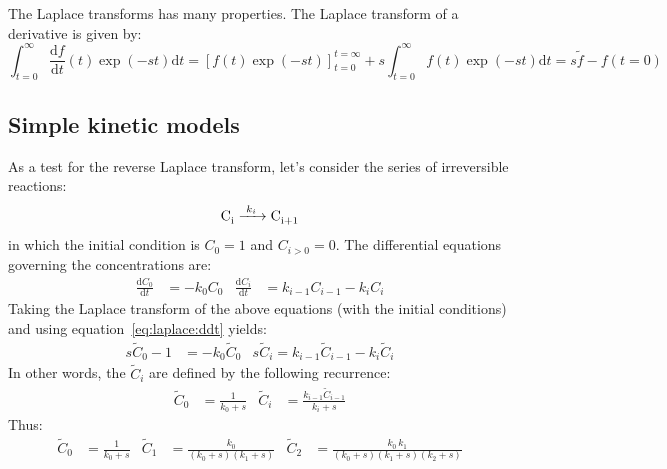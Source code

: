 \documentclass{article}
\newcommand{\dd}{\mathrm{d}}
\newcommand{\ddt}[1]{\frac{\dd #1}{\dd t}}
\newcommand{\pa}[1]{\left(#1\right)}
\begin{document}
\begin{testresult}
  \begin{center}
  \end{center}
  \caption{Results of the \texttt{operations/laplace.cmds} test,
    showing the accuracy of the reverse Laplace transforms}
\end{testresult}


The Laplace transforms has many properties.  The Laplace transform of
a derivative is given by:
%
\begin{equation}
  \int_{t = 0}^{\infty} \ddt{f}(t) \exp \pa{-st} \dd t
  = [f(t)\exp\pa{-st}]_{t = 0}^{t = \infty}
  + s \int_{t = 0}^{\infty} f(t) \exp \pa{-st}\dd t
  = s\tilde{f} - f(t = 0)
  \label{eq:laplace:ddt}
\end{equation}



\subsection{Simple kinetic models}

As a test for the reverse Laplace transform, let's consider the series
of irreversible reactions:
%
\begin{equation}
  \ce{C_{i} ->[k_i] C_{i+1}}
\end{equation}
%
in which the initial condition is $C_0 = 1$ and $C_{i>0} = 0$. The
differential equations governing the concentrations are:
%
\begin{align}
  \ddt{C_0} &= -k_0 C_0 &
  \ddt{C_i} &= k_{i-1} C_{i-1} - k_{i} C_{i} 
\end{align}
%
Taking the Laplace transform of the above equations (with the initial
conditions) and using equation~\eqref{eq:laplace:ddt} yields:
%
\begin{align}
  s \tilde{C}_0 - 1 &= -k_0 \tilde{C}_0 &
  s \tilde{C}_i = k_{i-1} \tilde{C}_{i-1} - k_{i} \tilde{C}_{i} 
\end{align}
%
In other words, the $\tilde{C}_i$ are defined by the following
recurrence:
%
\begin{align}
  \tilde{C}_0 &= \frac{1}{k_0 + s} &
  \tilde{C}_i &= \frac{k_{i-1} \tilde{C}_{i-1}}{k_i + s}
\end{align}
%
Thus:
\begin{align}
  \tilde{C}_0 &= \frac{1}{k_0 + s} & 
  \tilde{C}_1 &= \frac{k_{0}}{\pa{k_0 + s}\pa{k_1 + s}} &
  \tilde{C}_2 &= \frac{k_{0}\,k_1}{\pa{k_0 + s}\pa{k_1 + s}\pa{k_2 + s}}
\end{align}
\end{document}
